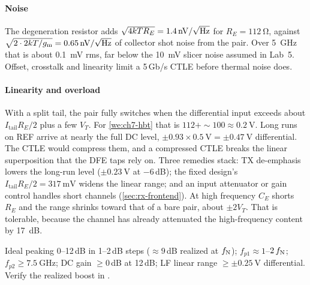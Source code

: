 \paragraph{Noise} The degeneration resistor adds $\sqrt{4kTR_E}=\qty{1.4}{\nano\volt\per\sqrt{\hertz}}$ for $R_E=\qty{112}{\ohm}$, against $\sqrt{2\cdot2kT/g_\mathrm{m}}=\qty{0.65}{\nano\volt\per\sqrt{\hertz}}$ of collector shot noise from the pair. Over \qty{5}{\giga\hertz} that is about \qty{0.1}{\milli\volt} rms, far below the \qty{10}{\milli\volt} slicer noise assumed in Lab~5. Offset, crosstalk and linearity limit a 5\,Gb/s CTLE before thermal noise does.

\paragraph{Linearity and overload} With a split tail, the pair fully switches when the differential input exceeds about $I_\mathrm{tail}R_E/2$ plus a few $V_T$. For \cref{we:ch7-hbt} that is $112+\sim100\approx\qty{0.2}{\volt}$. Long runs on REF arrive at nearly the full DC level, $\pm0.93\times\qty{0.5}{\volt}=\pm\qty{0.47}{\volt}$ differential. The CTLE would compress them, and a compressed CTLE breaks the linear superposition that the DFE taps rely on. Three remedies stack: TX de-emphasis lowers the long-run level ($\pm\qty{0.23}{\volt}$ at $-6$\,dB); the fixed design's $I_\mathrm{tail}R_E/2=\qty{317}{\milli\volt}$ widens the linear range; and an input attenuator or gain control handles short channels (\cref{sec:rx-frontend}). At high frequency $C_E$ shorts $R_E$ and the range shrinks toward that of a bare pair, about $\pm2V_T$. That is tolerable, because the channel has already attenuated the high-frequency content by \qty{17}{\deci\bel}.

\begin{specnote}
Ideal peaking 0--12\,dB in 1--2\,dB steps ($\approx9$\,dB realized at $f_\mathrm{N}$); $f_{p1}\approx1$--$2\,f_\mathrm{N}$; $f_{p2}\ge\qty{7.5}{\giga\hertz}$; DC gain $\ge0$\,dB at 12\,dB; LF linear range $\ge\pm\qty{0.25}{\volt}$ differential. Verify the realized boost in .
\end{specnote}

